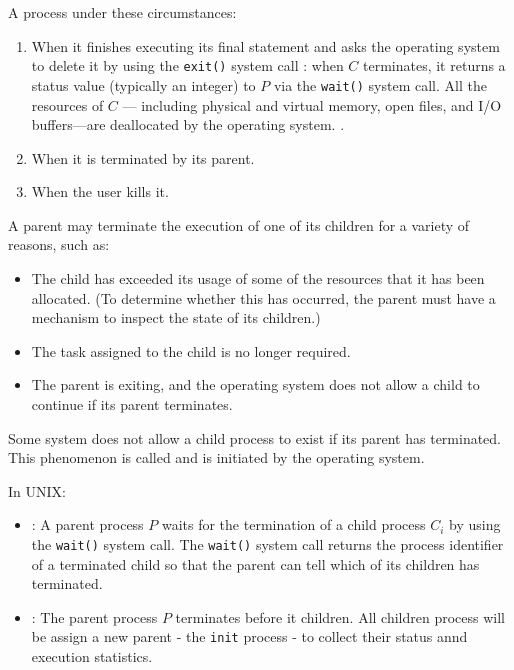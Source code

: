     \par A process  under these circumstances:
    \begin{enumerate}
      \item When it finishes executing its final statement and asks the operating system to delete it by using the \lstinline{exit()} system call \fnmark{}: when $C$ terminates, it returns a status value (typically an integer) to $P$ via the \lstinline{wait()} system call.  All the resources of $C$ — including physical and virtual memory, open files, and I/O buffers—are deallocated by the operating system.
        .
      \item When it is terminated by its parent.
      \item When the user kills it.
    \end{enumerate}
    \par A parent may terminate the execution of one of its children for a variety of reasons, such as:
    \begin{itemize}
      \item The child has exceeded its usage of some of the resources that it has been allocated. (To determine whether this has occurred, the parent must have a mechanism to inspect the state of its children.)
      \item The task assigned to the child is no longer required.
      \item The parent is exiting, and the operating system does not allow a child to
continue if its parent terminates.
    \end{itemize}
    \par Some system does not allow a child process to exist if its parent has terminated. This phenomenon is called  and is initiated by the operating system.
    \par In UNIX:
      \begin{itemize}
        \item {}: A parent process $P$ waits for the termination of a child process $C_i$ by using the \lstinline{wait()} system call. The \lstinline{wait()} system call returns the process identifier of a terminated child so that the parent can tell which of its children has terminated.
        \item {}: The parent process $P$ terminates before it children. All children process will be assign a new parent - the \lstinline{init} process - to collect their status annd execution statistics.
      \end{itemize}

